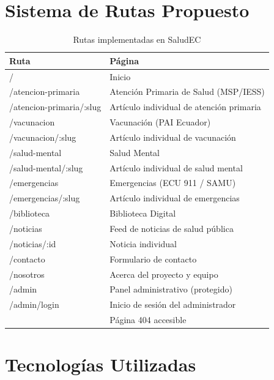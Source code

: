 \documentclass[12pt, a4paper]{article}
\begin{document}
\section{Sistema de Rutas Propuesto}

\begin{table}[H]
\centering
\caption{Rutas implementadas en SaludEC}
\small
\begin{tabular}{@{}>{\ttfamily\small}p{5.5cm} p{8cm}@{}}
\toprule
\rowcolor{royalblue!12}
\textbf{Ruta} & \textbf{Página} \\
\midrule
/                       & Inicio \\
/atencion-primaria      & Atención Primaria de Salud (MSP/IESS) \\
/atencion-primaria/:slug & Artículo individual de atención primaria \\
/vacunacion             & Vacunación (PAI Ecuador) \\
/vacunacion/:slug        & Artículo individual de vacunación \\
/salud-mental           & Salud Mental \\
/salud-mental/:slug      & Artículo individual de salud mental \\
/emergencias            & Emergencias (ECU 911 / SAMU) \\
/emergencias/:slug       & Artículo individual de emergencias \\
/biblioteca             & Biblioteca Digital \\
/noticias               & Feed de noticias de salud pública \\
/noticias/:id            & Noticia individual \\
/contacto               & Formulario de contacto \\
/nosotros               & Acerca del proyecto y equipo \\
/admin                  & Panel administrativo (protegido) \\
/admin/login            & Inicio de sesión del administrador \\
*                       & Página 404 accesible \\
\bottomrule
\end{tabular}
\end{table}

\section{Tecnologías Utilizadas}
\end{document}
